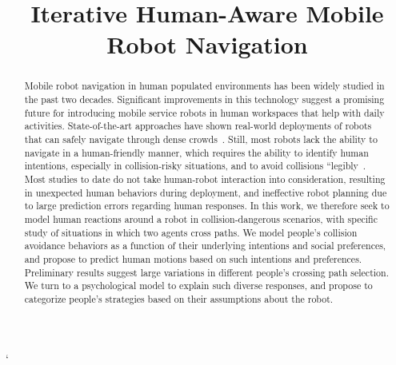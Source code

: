 \documentclass[conference]{IEEEtran}
\begin{document}
\title{Iterative Human-Aware Mobile Robot Navigation}


\author{
}


\maketitle

`\thispagestyle{fancy}
\begin{abstract}
Mobile robot navigation in human populated environments has been
widely studied in the past two decades. Significant improvements in
this technology suggest a promising future for introducing mobile
service robots in human workspaces that help with daily
activities. State-of-the-art approaches have shown real-world
deployments of robots that can safely navigate through dense
crowds~\cite{trautman2015robot, pfeiffer2016predicting}. Still, most
robots lack the ability to navigate in a human-friendly manner, which
requires the ability to identify human intentions, especially 
in collision-risky situations, and to avoid collisions 
“legibly~\cite{dragan2013legibility}.
Most studies to date do not
take human-robot interaction into consideration, resulting in
unexpected human behaviors during deployment, and ineffective robot planning 
due to large prediction errors regarding human responses. In this work, we 
therefore seek to model human reactions around a robot in collision-dangerous 
scenarios, with specific study of situations in which two agents cross paths. 
We model people's collision avoidance behaviors as a function of their 
underlying intentions and social preferences, and propose to predict human motions based on such 
intentions and preferences. Preliminary results suggest large variations in different people's 
crossing path selection. We turn to a psychological model 
to explain such diverse responses, and propose to categorize people's 
strategies based on their assumptions about the robot. 

\end{abstract}
\end{document}
